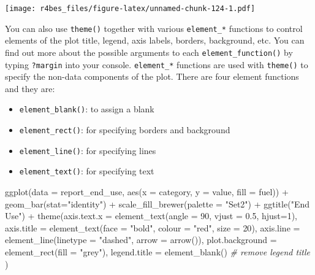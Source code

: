 \documentclass[
]{book}
\newenvironment{Shaded}{\begin{snugshade}}{\end{snugshade}}
\newcommand{\AttributeTok}[1]{\textcolor[rgb]{0.77,0.63,0.00}{#1}}
\newcommand{\CommentTok}[1]{\textcolor[rgb]{0.56,0.35,0.01}{\textit{#1}}}
\newcommand{\DecValTok}[1]{\textcolor[rgb]{0.00,0.00,0.81}{#1}}
\newcommand{\FloatTok}[1]{\textcolor[rgb]{0.00,0.00,0.81}{#1}}
\newcommand{\FunctionTok}[1]{\textcolor[rgb]{0.00,0.00,0.00}{#1}}
\newcommand{\NormalTok}[1]{#1}
\newcommand{\SpecialCharTok}[1]{\textcolor[rgb]{0.00,0.00,0.00}{#1}}
\newcommand{\StringTok}[1]{\textcolor[rgb]{0.31,0.60,0.02}{#1}}
\providecommand{\tightlist}{%
  \setlength{\itemsep}{0pt}\setlength{\parskip}{0pt}}
\begin{document}
\texttt{[image: r4bes\_files/figure-latex/unnamed-chunk-124-1.pdf]}

You can also use \texttt{theme()} together with various \texttt{element\_*} functions to control elements of the plot title, legend, axis labels, borders, background, etc. You can find out more about the possible arguments to each \texttt{element\_function()} by typing \texttt{?margin} into your console. \texttt{element\_*} functions are used with \texttt{theme()} to specify the non-data components of the plot. There are four element functions and they are:

\begin{itemize}
\tightlist
\item
  \texttt{element\_blank()}: to assign a blank
\item
  \texttt{element\_rect()}: for specifying borders and background
\item
  \texttt{element\_line()}: for specifying lines
\item
  \texttt{element\_text()}: for specifying text
\end{itemize}

\begin{Shaded}
\begin{Highlighting}[]
\FunctionTok{ggplot}\NormalTok{(}\AttributeTok{data =}\NormalTok{ report\_end\_use, }\FunctionTok{aes}\NormalTok{(}\AttributeTok{x =}\NormalTok{ category, }\AttributeTok{y =}\NormalTok{ value, }\AttributeTok{fill =}\NormalTok{ fuel)) }\SpecialCharTok{+}
    \FunctionTok{geom\_bar}\NormalTok{(}\AttributeTok{stat=}\StringTok{"identity"}\NormalTok{) }\SpecialCharTok{+} 
    \FunctionTok{scale\_fill\_brewer}\NormalTok{(}\AttributeTok{palette =} \StringTok{"Set2"}\NormalTok{) }\SpecialCharTok{+}
    \FunctionTok{ggtitle}\NormalTok{(}\StringTok{"End Use"}\NormalTok{) }\SpecialCharTok{+}
    \FunctionTok{theme}\NormalTok{(}\AttributeTok{axis.text.x =} \FunctionTok{element\_text}\NormalTok{(}\AttributeTok{angle =} \DecValTok{90}\NormalTok{, }\AttributeTok{vjust =} \FloatTok{0.5}\NormalTok{, }\AttributeTok{hjust=}\DecValTok{1}\NormalTok{),}
          \AttributeTok{axis.title =} \FunctionTok{element\_text}\NormalTok{(}\AttributeTok{face =} \StringTok{"bold"}\NormalTok{, }
                                    \AttributeTok{colour =} \StringTok{"red"}\NormalTok{,}
                                    \AttributeTok{size =} \DecValTok{20}\NormalTok{),}
          \AttributeTok{axis.line =} \FunctionTok{element\_line}\NormalTok{(}\AttributeTok{linetype =} \StringTok{"dashed"}\NormalTok{, }
                                   \AttributeTok{arrow =} \FunctionTok{arrow}\NormalTok{()),}
          \AttributeTok{plot.background =} \FunctionTok{element\_rect}\NormalTok{(}\AttributeTok{fill =} \StringTok{"grey"}\NormalTok{),}
          \AttributeTok{legend.title =} \FunctionTok{element\_blank}\NormalTok{() }\CommentTok{\# remove legend title}
\NormalTok{          )}
\end{Highlighting}
\end{Shaded}
\end{document}
